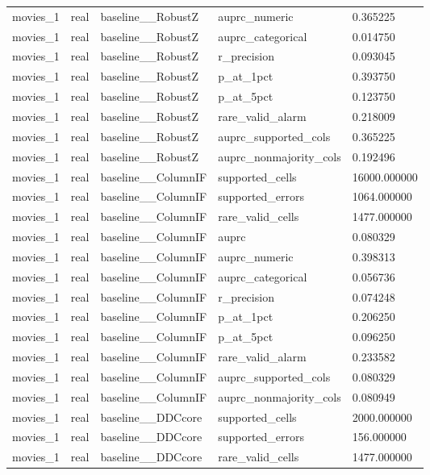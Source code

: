 \begin{tabular}{lllll}
movies\_1 & real & baseline\_\_RobustZ & auprc\_numeric & 0.365225 \\
movies\_1 & real & baseline\_\_RobustZ & auprc\_categorical & 0.014750 \\
movies\_1 & real & baseline\_\_RobustZ & r\_precision & 0.093045 \\
movies\_1 & real & baseline\_\_RobustZ & p\_at\_1pct & 0.393750 \\
movies\_1 & real & baseline\_\_RobustZ & p\_at\_5pct & 0.123750 \\
movies\_1 & real & baseline\_\_RobustZ & rare\_valid\_alarm & 0.218009 \\
movies\_1 & real & baseline\_\_RobustZ & auprc\_supported\_cols & 0.365225 \\
movies\_1 & real & baseline\_\_RobustZ & auprc\_nonmajority\_cols & 0.192496 \\
movies\_1 & real & baseline\_\_ColumnIF & supported\_cells & 16000.000000 \\
movies\_1 & real & baseline\_\_ColumnIF & supported\_errors & 1064.000000 \\
movies\_1 & real & baseline\_\_ColumnIF & rare\_valid\_cells & 1477.000000 \\
movies\_1 & real & baseline\_\_ColumnIF & auprc & 0.080329 \\
movies\_1 & real & baseline\_\_ColumnIF & auprc\_numeric & 0.398313 \\
movies\_1 & real & baseline\_\_ColumnIF & auprc\_categorical & 0.056736 \\
movies\_1 & real & baseline\_\_ColumnIF & r\_precision & 0.074248 \\
movies\_1 & real & baseline\_\_ColumnIF & p\_at\_1pct & 0.206250 \\
movies\_1 & real & baseline\_\_ColumnIF & p\_at\_5pct & 0.096250 \\
movies\_1 & real & baseline\_\_ColumnIF & rare\_valid\_alarm & 0.233582 \\
movies\_1 & real & baseline\_\_ColumnIF & auprc\_supported\_cols & 0.080329 \\
movies\_1 & real & baseline\_\_ColumnIF & auprc\_nonmajority\_cols & 0.080949 \\
movies\_1 & real & baseline\_\_DDCcore & supported\_cells & 2000.000000 \\
movies\_1 & real & baseline\_\_DDCcore & supported\_errors & 156.000000 \\
movies\_1 & real & baseline\_\_DDCcore & rare\_valid\_cells & 1477.000000 \\

\end{tabular}
